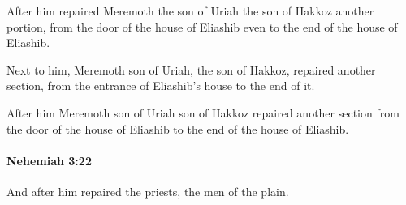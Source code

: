 			\begin{versebox}
					\item[BHS] 
					\item[LXX] 
					\item[ASV] After him repaired Meremoth the son of Uriah the son of Hakkoz another portion, from the door of the house of Eliashib even to the end of the house of Eliashib.
					\item[NIV] Next to him, Meremoth son of Uriah, the son of Hakkoz, repaired another section, from the entrance of Eliashib’s house to the end of it.
					\item[NRSV] After him Meremoth son of Uriah son of Hakkoz repaired another section from the door of the house of Eliashib to the end of the house of Eliashib.
			\end{versebox}

		\paragraph{Nehemiah 3:22} %
			\label{NEHEMIAH-3-22}

			And after him repaired the priests, the men of the plain.

